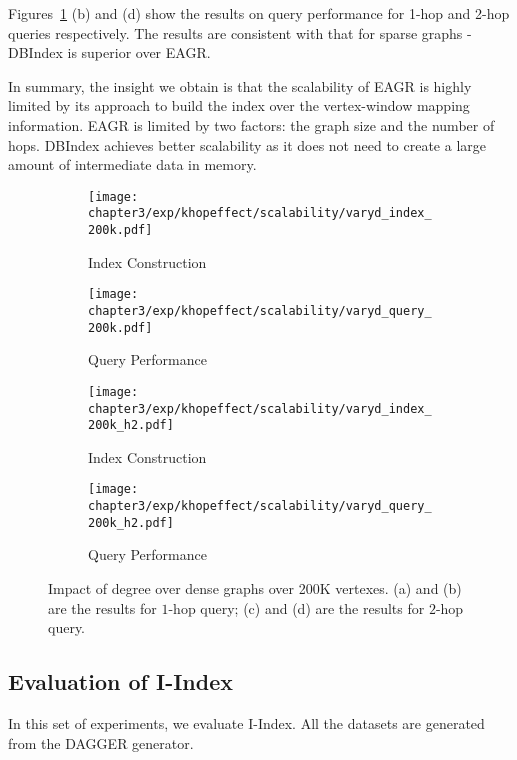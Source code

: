 Figures~\ref{fig:khop_v200k} 
(b) and (d) show the results on query performance 
for 1-hop and 2-hop queries respectively. 
The results are consistent with that for sparse graphs
- DBIndex is superior over EAGR. 

In summary, the insight we obtain is that the scalability of EAGR 
is highly limited by its approach to build the index over 
the vertex-window mapping information. EAGR is limited 
by two factors: the graph size and the number of hops. 
DBIndex achieves better scalability as it does not need to 
create a large amount of intermediate data in memory. 

\begin{figure}[h]
\centering
\begin{subfigure}{0.48\linewidth}
  \centering
  \texttt{[image: chapter3/exp/khopeffect/scalability/varyd\_index\_200k.pdf]}
  \caption{Index Construction}
\end{subfigure}
\begin{subfigure}{0.48\linewidth}
  \centering
  \texttt{[image: chapter3/exp/khopeffect/scalability/varyd\_query\_200k.pdf]}
  \caption{Query Performance}
\end{subfigure}
\begin{subfigure}{0.48\linewidth}
  \centering
  \texttt{[image: chapter3/exp/khopeffect/scalability/varyd\_index\_200k\_h2.pdf]}
  \caption{Index Construction}
\end{subfigure}
\begin{subfigure}{0.48\linewidth}
  \centering
  \texttt{[image: chapter3/exp/khopeffect/scalability/varyd\_query\_200k\_h2.pdf]}
  \caption{Query Performance }
\end{subfigure}
\caption{Impact of degree over dense graphs over 200K vertexes. (a) and (b) are the results for $1$-hop query; (c) and (d) are the results for $2$-hop query. }
\label{fig:khop_v200k}
\end{figure}

\subsection{Evaluation of I-Index}
In this set of experiments, we evaluate I-Index. 
All the datasets are generated from the DAGGER generator.   

